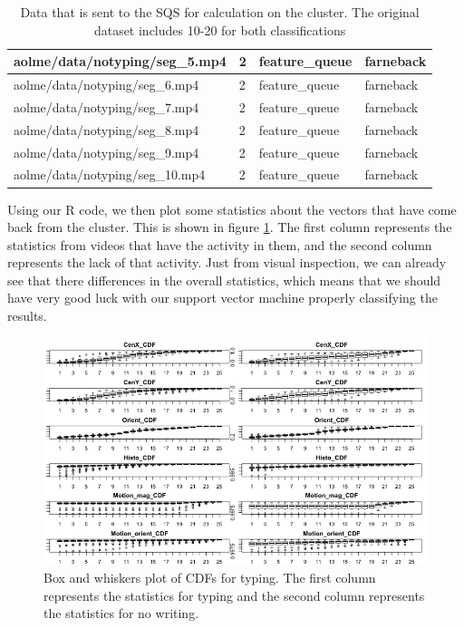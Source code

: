 \begin{table}[h]
\begin{tabular}{ | l | l | l | l |}
  aolme/data/notyping/seg\_5.mp4 & 2 & feature\_queue & farneback\\\hline
  aolme/data/notyping/seg\_6.mp4 & 2 & feature\_queue & farneback\\\hline
  aolme/data/notyping/seg\_7.mp4 & 2 & feature\_queue & farneback\\\hline
  aolme/data/notyping/seg\_8.mp4 & 2 & feature\_queue & farneback\\\hline
  aolme/data/notyping/seg\_9.mp4 & 2 & feature\_queue & farneback\\\hline
  aolme/data/notyping/seg\_10.mp4 & 2 & feature\_queue & farneback\\\hline
  \end{tabular}
  \caption{Data that is sent to the SQS for calculation on the cluster. The
  original dataset includes 10-20 for both classifications}
\end{table}

Using our R code, we then plot some statistics about the vectors that have come
back from the cluster. This is shown in figure \ref{fig:typing_box_whiskers}.
The first column represents the statistics from videos that have the activity
in them, and the second column represents the lack of that activity. Just from
visual inspection, we can already see that there differences in the overall
statistics, which means that we should have very good luck with our support
vector machine properly classifying the results.

\FloatBarrier

\begin{figure}[h]
  \label{fig:typing_box_whiskers}
  \centering
  \includegraphics[width=\textwidth]{figures/typing_box_whiskers}
  \caption{Box and whiskers plot of CDFs for typing. The first column represents the
  statistics for typing and the second column represents the statistics for no
  writing.}
\end{figure}

